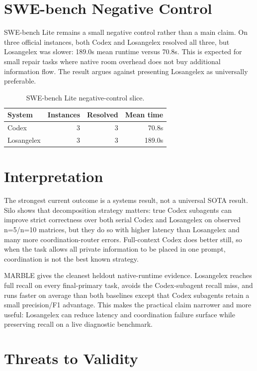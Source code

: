\documentclass[10pt,twocolumn]{article}
\begin{document}
\section{SWE-bench Negative Control}

SWE-bench Lite remains a small negative control rather than a main claim. On three official instances, both Codex and Losangelex resolved all three, but Losangelex was slower: 189.0s mean runtime versus 70.8s. This is expected for small repair tasks where native room overhead does not buy additional information flow. The result argues against presenting Losangelex as universally preferable.

\begin{table}[t]
\centering
\scriptsize
\caption{SWE-bench Lite negative-control slice.}
\begin{tabularx}{\columnwidth}{@{}lrrr@{}}
\toprule
System & Instances & Resolved & Mean time \\
\midrule
Codex & 3 & 3 & 70.8s \\
Losangelex & 3 & 3 & 189.0s \\
\bottomrule
\end{tabularx}
\label{tab:swebench}
\end{table}

\section{Interpretation}

The strongest current outcome is a systems result, not a universal SOTA result. Silo shows that decomposition strategy matters: true Codex subagents can improve strict correctness over both serial Codex and Losangelex on observed n=5/n=10 matrices, but they do so with higher latency than Losangelex and many more coordination-router errors. Full-context Codex does better still, so when the task allows all private information to be placed in one prompt, coordination is not the best known strategy.

MARBLE gives the cleanest heldout native-runtime evidence. Losangelex reaches full recall on every final-primary task, avoids the Codex-subagent recall miss, and runs faster on average than both baselines except that Codex subagents retain a small precision/F1 advantage. This makes the practical claim narrower and more useful: Losangelex can reduce latency and coordination failure surface while preserving recall on a live diagnostic benchmark.

\section{Threats to Validity}
\end{document}
